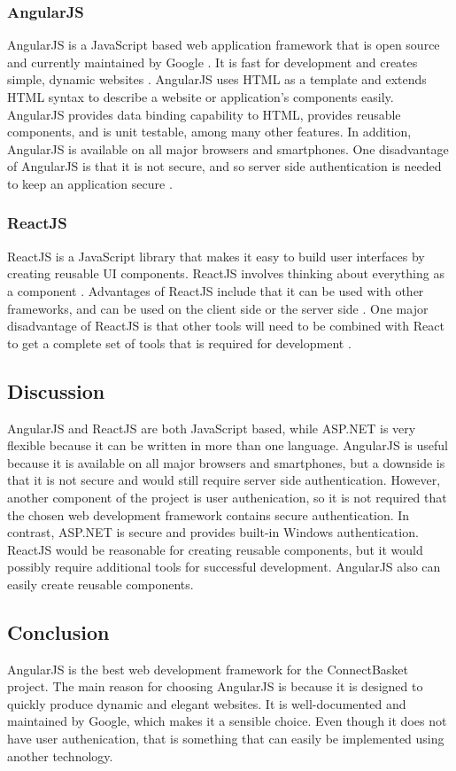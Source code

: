 \documentclass[onecolumn, draftclsnofoot,10pt, compsoc]{IEEEtran}
\begin{document}
\subsubsection{AngularJS}
AngularJS is a JavaScript based web application framework that is open source and currently maintained by Google \cite{angular}. It is fast for development and creates simple, dynamic websites \cite{angularjs}. AngularJS uses HTML as a template and extends HTML syntax to describe a website or application's components easily. AngularJS provides data binding capability to HTML, provides reusable components, and is unit testable, among many other features. In addition, AngularJS is available on all major browsers and smartphones. One disadvantage of AngularJS is that it is not secure, and so server side authentication is needed to keep an application secure \cite{angular}.

\subsubsection{ReactJS}
ReactJS is a JavaScript library that makes it easy to build user interfaces by creating reusable UI components\cite{react}. ReactJS involves thinking about everything as a component \cite{react}. Advantages of ReactJS include that it can be used with other frameworks, and can be used on the client side or the server side \cite{react}. One major disadvantage of ReactJS is that other tools will need to be combined with React to get a complete set of tools that is required for development \cite{react}. 

\subsection{Discussion}
AngularJS and ReactJS are both JavaScript based, while ASP.NET is very flexible because it can be written in more than one language. AngularJS is useful because it is available on all major browsers and smartphones, but a downside is that it is not secure and would still require server side authentication. However, another component of the project is user authenication, so it is not required that the chosen web development framework contains secure authentication. In contrast, ASP.NET is secure and provides built-in Windows authentication. ReactJS would be reasonable for creating reusable components, but it would possibly require additional tools for successful development. AngularJS also can easily create reusable components.

\subsection{Conclusion}
AngularJS is the best web development framework for the ConnectBasket project. The main reason for choosing AngularJS is because it is designed to quickly produce dynamic and elegant websites. It is well-documented and maintained by Google, which makes it a sensible choice. Even though it does not have user authenication, that is something that can easily be implemented using another technology. 
\end{document}
